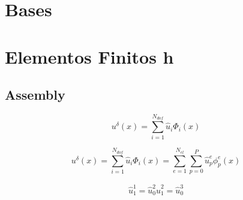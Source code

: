\section{Bases}
\section{Elementos Finitos h} 
\subsection{Assembly}
\begin{equation}
u^{\delta}(x) = \sum^{N_{dof}}_{i = 1} \hat{u}_i \Phi_i(x) 
\end{equation}

\begin{equation}
 u^{\delta}(x) = \sum^{N_{dof}}_{i = 1} \hat{u}_i \Phi_i(x) = \sum^{N_{el}}_{e=1} \sum^{P}_{p=0}  \hat{u}^{e}_p \phi^{e}_p(x)
\end{equation}

\begin{align}
\hat{u}^{1}_{1} = \hat{u}^{2}_{0}
\hat{u}^{2}_{1} = \hat{u}^{3}_{0}
\end{align}



